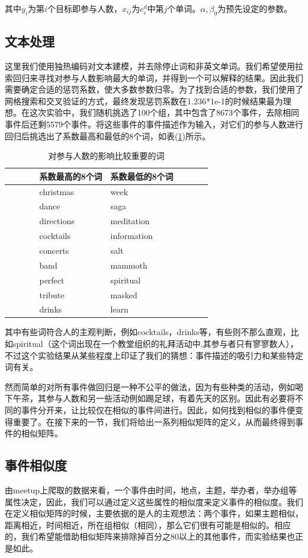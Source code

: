 其中\(y_i\)为第\(i\)个目标即参与人数，\(x_{ij}\)为\(e_i^d\)中第\(j\)个单词。\(\alpha,\beta_0\)为预先设定的参数。
\subsection{文本处理}\label{3.2}
这里我们使用独热编码对文本建模，并去除停止词和非英文单词。我们希望使用拉索回归来寻找对参与人数影响最大的单词，并得到一个可以解释的结果。因此我们需要确定合适的惩罚系数，使大多数参数归零。为了找到合适的参数，我们使用了网格搜索和交叉验证的方式，最终发现惩罚系数在1.236*1e-1的时候结果最为理想。在这次实验中，我们随机挑选了100个组，其中包含了8673个事件，去除相同事件后还剩5579个事件。将这些事件的事件描述作为输入，对它们的参与人数进行回归后挑选出了系数最高和最低的8个词，如表(\ref{t1-2})所示。
\begin{table}[htbp]

\caption{\label{t1-2}对参与人数的影响比较重要的词}
  \centering
    \begin{tabular*}{\linewidth}{p{0.15\linewidth}p{0.35\linewidth}p{0.35\linewidth}p{0.15\linewidth}}
\toprule      
    &系数最高的8个词 & 系数最低的8个词&\tabularnewline
\midrule
&christmas & week&\tabularnewline
&dance & saga&\tabularnewline
&directions & meditation&\tabularnewline
&cocktails & information&\tabularnewline
&concerts & salt&\tabularnewline
&band & mammoth&\tabularnewline
&perfect & spiritual&\tabularnewline
&tribute & masked&\tabularnewline
&drinks & learn&\tabularnewline
\bottomrule
    \end{tabular*}
\end{table}

其中有些词符合人的主观判断，例如cocktails，drinks等，有些则不那么直观，比如spiritual（这个词出现在一个教堂组织的礼拜活动中,其参与者只有寥寥数人），不过这个实验结果从某些程度上印证了我们的猜想：事件描述的吸引力和某些特定词有关。

然而简单的对所有事件做回归是一种不公平的做法，因为有些种类的活动，例如喝下午茶，其参与人数和另一些活动例如踢足球，有着先天的区别。因此有必要将不同的事件分开来，让比较仅在相似的事件间进行。因此，如何找到相似的事件便变得重要了。在接下来的一节，我们将给出一系列相似矩阵的定义，从而最终得到事件的相似矩阵。
\subsection{事件相似度}\label{s1-4}
由meetup上爬取的数据来看，一个事件由时间，地点，主题，举办者，举办组等属性决定，因此，我们可以通过定义这些属性的相似度来定义事件的相似度。我们在定义相似矩阵的时候，主要依据的是人的主观想法：两个事件，如果主题相似，距离相近，时间相近，所在组相似（相同），那么它们很有可能是相似的。相应的，我们希望能借助相似矩阵来排除掉百分之80以上的其他事件，而实验结果也正是如此。

